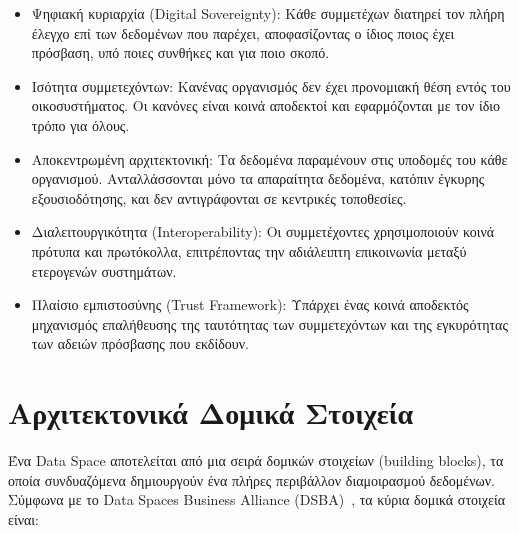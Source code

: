 \begin{itemize}
    \item Ψηφιακή κυριαρχία (\textlatin{Digital Sovereignty}): Κάθε συμμετέχων
    διατηρεί τον πλήρη έλεγχο επί των δεδομένων που παρέχει, αποφασίζοντας ο ίδιος ποιος
    έχει πρόσβαση, υπό ποιες συνθήκες και για ποιο σκοπό.

    \item Ισότητα συμμετεχόντων: Κανένας οργανισμός δεν έχει προνομιακή θέση
    εντός του οικοσυστήματος. Οι κανόνες είναι κοινά αποδεκτοί και εφαρμόζονται με
    τον ίδιο τρόπο για όλους.

    \item Αποκεντρωμένη αρχιτεκτονική: Τα δεδομένα παραμένουν στις υποδομές
    του κάθε οργανισμού. Ανταλλάσσονται μόνο τα απαραίτητα δεδομένα, κατόπιν
    έγκυρης εξουσιοδότησης, και δεν αντιγράφονται σε κεντρικές τοποθεσίες.

    \item Διαλειτουργικότητα (\textlatin{Interoperability}): Οι συμμετέχοντες
    χρησιμοποιούν κοινά πρότυπα και πρωτόκολλα, επιτρέποντας την αδιάλειπτη επικοινωνία
    μεταξύ ετερογενών συστημάτων.

    \item Πλαίσιο εμπιστοσύνης (\textlatin{Trust Framework}): Υπάρχει ένας
    κοινά αποδεκτός μηχανισμός επαλήθευσης της ταυτότητας των συμμετεχόντων και της
    εγκυρότητας των αδειών πρόσβασης που εκδίδουν.
\end{itemize}

\section{Αρχιτεκτονικά Δομικά Στοιχεία}
\label{sec:building-blocks}

Ένα \textlatin{Data Space} αποτελείται από μια σειρά δομικών στοιχείων
(\textlatin{building blocks}), τα οποία συνδυαζόμενα δημιουργούν ένα πλήρες
περιβάλλον διαμοιρασμού δεδομένων. Σύμφωνα με το \textlatin{Data Spaces Business
Alliance (DSBA)}~\cite{dsba2023}, τα κύρια δομικά στοιχεία είναι:

